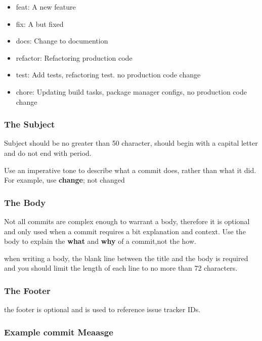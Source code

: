 \documentclass[11pt]{article}
\begin{document}
\begin{itemize}
\item feat: A new feature
\item fix: A but fixed
\item docs: Change to documention
\item refactor: Refactoring production code
\item test: Add tests, refactoring test. no production code change
\item chore: Updating build  tasks, package manager configs, no production code change
\end{itemize}

\subsubsection{The Subject}
\label{sec:org6f6b6ac}
Subject should be no  greater than 50  character, should begin with a capital letter and do not end with period.

Use an imperative tone to describe what a commit does, rather than what it did. For example, use \textbf{change}; not changed

\subsubsection{The Body}
\label{sec:orga8f9b75}
Not all commits are complex enough to warrant a body, therefore it is optional and only used when a commit requires a bit explanation and context. Use the body to explain the \textbf{what} and \textbf{why} of a commit,not the how.

when writing a body, the blank line between the title and the body is required and you should limit the length of each line to no more than 72 characters.

\subsubsection{The Footer}
\label{sec:org86dc8d6}
the footer is optional and is used to reference issue tracker IDs.

\subsubsection{Example commit Meaasge}
\label{sec:org0e5a64f}
\end{document}
